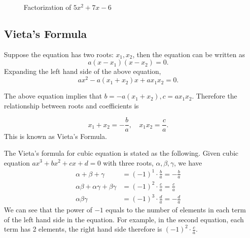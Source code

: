 \documentclass[11pt, oneside]{article}   	%
\begin{document}
\begin{figure}
\centering 
{}
\caption{Factorization of $5x^2 + 7x -6$}
\label{fig:factorization}
\end{figure}


\subsection{Vieta's Formula}
Suppose the equation has two roots: $x_1, x_2$, then the equation can be written as
\[a(x-x_1)(x-x_2)=0.\]
Expanding the left hand side of the above equation, 
\[ax^2 - a(x_1 + x_2)x + ax_1 x_2 = 0.\]

The above equation implies that $b = -a(x_1 + x_2), c = ax_1 x_2$. Therefore the relationship between roots and coefficients is 



\[x_1 + x_2= -\frac{b}{a}, \quad  x_1 x_2 = \frac{c}{a}.\]
This is known as Vieta's Formula.

The Vieta's formula for cubic equation is stated as the following. Given cubic equation $ax^3+bx^2+cx+d=0$ with three roots, $\alpha, \beta, \gamma$, we have 
\begin{align*}
\alpha + \beta + \gamma &= (-1)^1 \cdot \frac{b}{a} = -\frac{b}{a}\\
\alpha\beta + \alpha\gamma + \beta\gamma &= (-1)^2 \cdot \frac{c}{a} = \frac{c}{a}\\
\alpha\beta\gamma &= (-1)^3 \cdot \frac{d}{a} = -\frac{d}{a}
\end{align*}
We can see that the power of $-1$ equals to the number of elements in each term of the left hand side in the equation. For example, in the second equation, each term has 2 elements, the right hand side therefore is $(-1)^2 \cdot \frac{c}{a}$.
\end{document}
